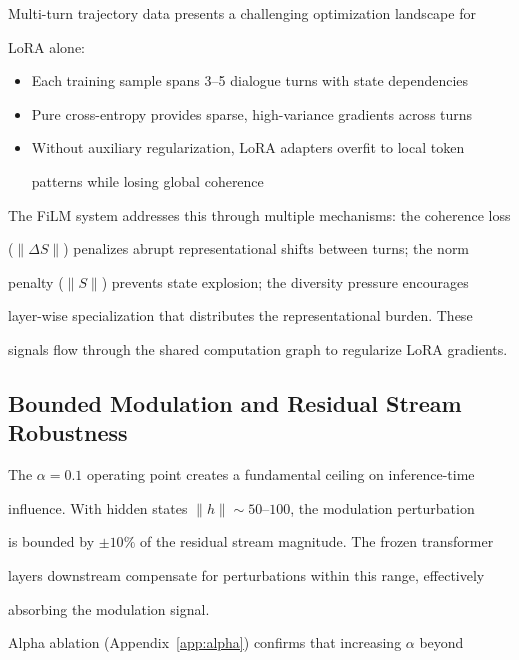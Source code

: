 \documentclass[11pt,a4paper]{article}
\begin{document}
Multi-turn trajectory data presents a challenging optimization landscape for

LoRA alone:

\begin{itemize}

  \item Each training sample spans 3--5 dialogue turns with state dependencies

  \item Pure cross-entropy provides sparse, high-variance gradients across turns

  \item Without auxiliary regularization, LoRA adapters overfit to local token

    patterns while losing global coherence

\end{itemize}



The FiLM system addresses this through multiple mechanisms: the coherence loss

($\|\Delta S\|$) penalizes abrupt representational shifts between turns; the norm

penalty ($\|S\|$) prevents state explosion; the diversity pressure encourages

layer-wise specialization that distributes the representational burden. These

signals flow through the shared computation graph to regularize LoRA gradients.



\subsection{Bounded Modulation and Residual Stream Robustness}



The $\alpha = 0.1$ operating point creates a fundamental ceiling on inference-time

influence. With hidden states $\|h\| \sim 50$--$100$, the modulation perturbation

is bounded by $\pm 10\%$ of the residual stream magnitude. The frozen transformer

layers downstream compensate for perturbations within this range, effectively

absorbing the modulation signal.



Alpha ablation (Appendix~\ref{app:alpha}) confirms that increasing $\alpha$ beyond
\end{document}
